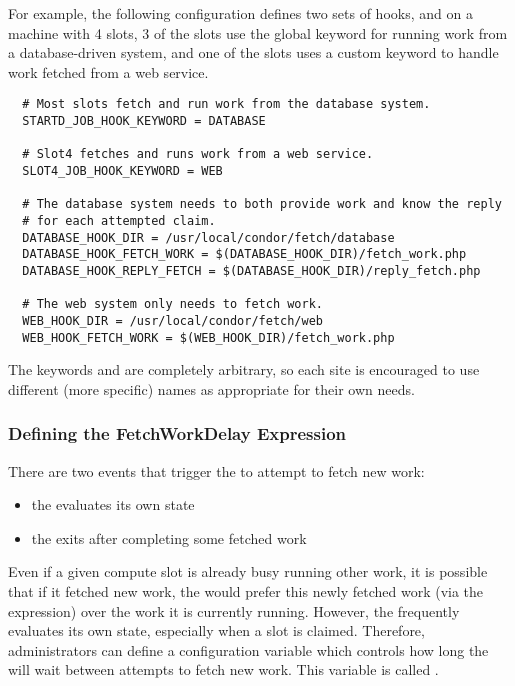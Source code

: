 For example, the following configuration defines two sets of hooks,
and on a machine with 4 slots, 3 of the slots use the global keyword
for running work from a database-driven system, and one of the slots
uses a custom keyword to handle work fetched from a web service.
\footnotesize
\begin{verbatim}
  # Most slots fetch and run work from the database system.
  STARTD_JOB_HOOK_KEYWORD = DATABASE

  # Slot4 fetches and runs work from a web service.
  SLOT4_JOB_HOOK_KEYWORD = WEB

  # The database system needs to both provide work and know the reply
  # for each attempted claim.
  DATABASE_HOOK_DIR = /usr/local/condor/fetch/database
  DATABASE_HOOK_FETCH_WORK = $(DATABASE_HOOK_DIR)/fetch_work.php
  DATABASE_HOOK_REPLY_FETCH = $(DATABASE_HOOK_DIR)/reply_fetch.php

  # The web system only needs to fetch work.
  WEB_HOOK_DIR = /usr/local/condor/fetch/web
  WEB_HOOK_FETCH_WORK = $(WEB_HOOK_DIR)/fetch_work.php
\end{verbatim}
\normalsize

The keywords  and  are completely arbitrary, so
each site is encouraged to use different (more specific) names as
appropriate for their own needs.


\subsubsection{\label{sec:job-hooks-fetch-work-delay}
Defining the FetchWorkDelay Expression}

There are two events that trigger the  to attempt to
fetch new work:
\begin{itemize}
\item the  evaluates its own state
\item the  exits after completing some fetched work
\end{itemize}

Even if a given compute slot is already busy running other work, it is
possible that if it fetched new work, the  would prefer
this newly fetched work (via the  expression) over the work it
is currently running.
However, the  frequently evaluates its own state,
especially when a slot is claimed.
Therefore, administrators can define a configuration variable which controls
how long the  will wait between attempts to fetch new work.
This variable is called .

